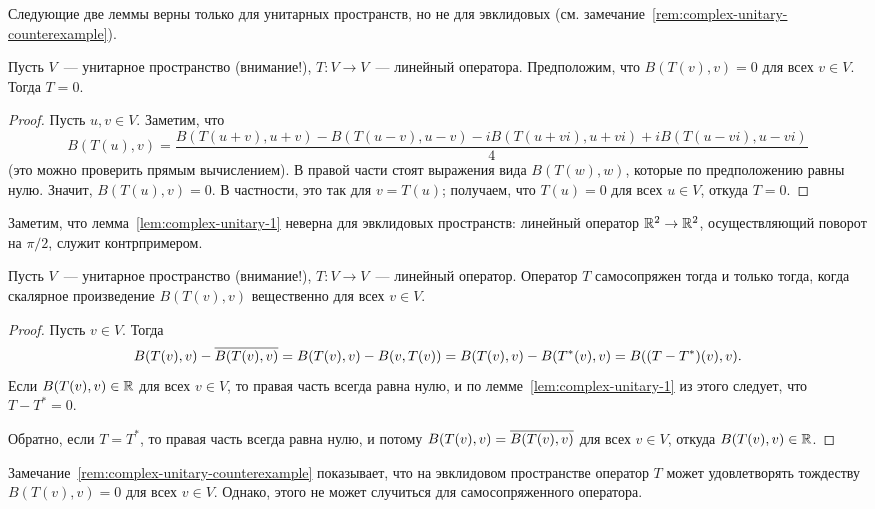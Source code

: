 Следующие две леммы верны только для унитарных пространств,
но не для эвклидовых
(см. замечание~\ref{rem:complex-unitary-counterexample}).

\begin{lemma}\label{lem:complex-unitary-1}
Пусть $V$~--- унитарное пространство (внимание!),
$T\colon V\to V$~--- линейный оператора.
Предположим, что $B(T(v),v) = 0$ для всех $v\in V$.
Тогда $T = 0$.
\end{lemma}
\begin{proof}
Пусть $u,v\in V$.
Заметим, что
$$
B(T(u),v) =
\frac{B(T(u+v),u+v) - B(T(u-v),u-v) - iB(T(u+vi),u+vi) + iB(T(u-vi),u-vi)}{4}
$$
(это можно проверить прямым вычислением).
В правой части стоят выражения вида $B(T(w),w)$, которые
по предположению равны нулю. Значит, $B(T(u),v)=0$.
В частности, это так для $v = T(u)$; получаем, что $T(u)=0$
для всех $u\in V$, откуда $T=0$.
\end{proof}

\begin{remark}\label{rem:complex-unitary-counterexample}
Заметим, что лемма~\ref{lem:complex-unitary-1} неверна для
эвклидовых пространств: линейный оператор $\mathbb R^2\to\mathbb R^2$,
осуществляющий поворот на $\pi/2$, служит контрпримером.
\end{remark}

\begin{lemma}
Пусть $V$~--- унитарное пространство (внимание!),
$T\colon V\to V$~--- линейный оператор.
Оператор $T$ самосопряжен тогда и только тогда, когда
скалярное произведение $B(T(v),v)$ вещественно
для всех $v\in V$.
\end{lemma}
\begin{proof}
Пусть $v\in V$.
Тогда 
$$
B(T(v),v) - \overline{B(T(v),v)} = B(T(v),v) - B(v,T(v))
= B(T(v),v) - B(T^*(v),v)
= B((T-T^*)(v),v).
$$
Если $B(T(v),v)\in\mathbb R$ для всех $v\in V$, то правая часть
всегда равна нулю, и по лемме~\ref{lem:complex-unitary-1}
из этого следует, что $T-T^*=0$.

Обратно, если $T = T^*$, то правая часть всегда равна нулю,
и потому $B(T(v),v) = \overline{B(T(v),v)}$ для всех $v\in V$,
откуда $B(T(v),v)\in\mathbb R$.
\end{proof}

\begin{remark}
Замечание~\ref{rem:complex-unitary-counterexample} показывает,
что на эвклидовом пространстве оператор $T$ может удовлетворять
тождеству $B(T(v),v)=0$ для всех $v\in V$. Однако,
этого не может случиться для самосопряженного оператора.
\end{remark}

